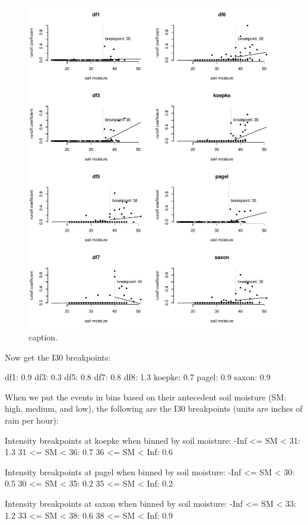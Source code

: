 \documentclass[12pt]{article}
\begin{document}
\begin{figure}
    \begin{center}
\includegraphics{runoff-sm}
    \end{center}
    \caption{caption.\label{sm}}
\end{figure}


Now get the I30 breakpoints:\\

\begin{Schunk}
\begin{Soutput}
df1: 0.9
df3: 0.3
df5: 0.8
df7: 0.8
df8: 1.3
koepke: 0.7
pagel: 0.9
saxon: 0.9
\end{Soutput}
\end{Schunk}


When we put the events in bins based on their antecedent soil moisture (SM: high, medium, and low), the following are the I30 breakpoints (units are inches of rain per hour):\\

\begin{Schunk}
\begin{Soutput}
Intensity breakpoints at koepke when binned by soil moisture:
-Inf <= SM < 31: 1.3
31 <= SM < 36: 0.7
36 <= SM < Inf: 0.6

Intensity breakpoints at pagel when binned by soil moisture:
-Inf <= SM < 30: 0.5
30 <= SM < 35: 0.2
35 <= SM < Inf: 0.2

Intensity breakpoints at saxon when binned by soil moisture:
-Inf <= SM < 33: 1.2
33 <= SM < 38: 0.6
38 <= SM < Inf: 0.9
\end{Soutput}
\end{Schunk}
\end{document}
